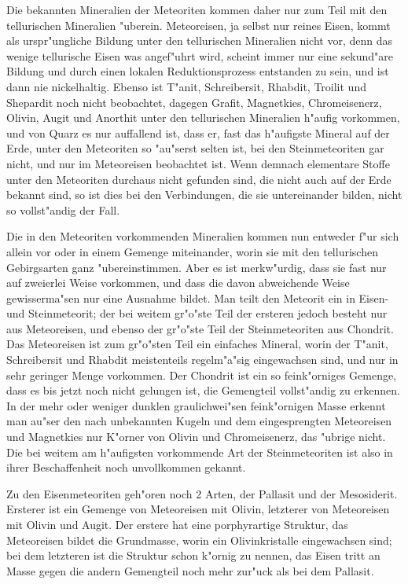 \documentclass[a4paper, 11pt, oneside]{article}
\begin{document}
Die bekannten Mineralien der Meteoriten kommen daher nur zum Teil mit den tellurischen Mineralien "uberein. Meteoreisen, ja selbst nur reines Eisen, kommt als urspr"ungliche Bildung unter den tellurischen Mineralien nicht vor, denn das wenige tellurische Eisen was angef"uhrt wird, scheint immer nur eine sekund"are Bildung und durch einen lokalen Reduktionsprozess entstanden zu sein, und ist dann nie nickelhaltig. Ebenso ist T"anit, Schreibersit, Rhabdit, Troilit und Shepardit noch nicht beobachtet, dagegen Grafit, Magnetkies, Chromeisenerz, Olivin, Augit und Anorthit unter den tellurischen Mineralien h"aufig vorkommen, und von Quarz es nur auffallend ist, dass er, fast das h"aufigste Mineral auf der Erde, unter den Meteoriten so "au"serst selten ist, bei den Steinmeteoriten gar nicht, und nur im Meteoreisen beobachtet ist. Wenn demnach elementare Stoffe unter den Meteoriten durchaus nicht gefunden sind, die nicht auch auf der Erde bekannt sind, so ist dies bei den Verbindungen, die sie untereinander bilden, nicht so vollst"andig der Fall.

Die in den Meteoriten vorkommenden Mineralien kommen nun entweder f"ur sich allein vor oder in einem Gemenge miteinander, worin sie mit den tellurischen Gebirgsarten ganz "ubereinstimmen. Aber es ist merkw"urdig, dass sie fast nur auf zweierlei Weise vorkommen, und dass die davon abweichende Weise gewisserma"sen nur eine Ausnahme bildet. Man teilt den Meteorit ein in Eisen- und Steinmeteorit; der bei weitem gr"o"ste Teil der ersteren jedoch besteht nur aus Meteoreisen, und ebenso der gr"o"ste Teil der Steinmeteoriten aus Chondrit. Das Meteoreisen ist zum gr"o"sten Teil ein einfaches Mineral, worin der T"anit, Schreibersit und Rhabdit meistenteils regelm"a"sig eingewachsen sind, und nur in sehr geringer Menge vorkommen. Der Chondrit ist ein so feink"orniges Gemenge, dass es bis jetzt noch nicht gelungen ist, die Gemengteil vollst"andig zu erkennen. In der mehr oder weniger dunklen graulichwei"sen feink"ornigen Masse erkennt man au"ser den nach unbekannten Kugeln und dem eingesprengten Meteoreisen und Magnetkies nur K"orner von Olivin und Chromeisenerz, das "ubrige nicht. Die bei weitem am h"aufigsten vorkommende Art der Steinmeteoriten ist also in ihrer Beschaffenheit noch unvollkommen gekannt.

Zu den Eisenmeteoriten geh"oren noch 2 Arten, der Pallasit und der Mesosiderit. Ersterer ist ein Gemenge von Meteoreisen mit Olivin, letzterer von Meteoreisen mit Olivin und Augit. Der erstere hat eine porphyrartige Struktur, das Meteoreisen bildet die Grundmasse, worin ein Olivinkristalle eingewachsen sind; bei dem letzteren ist die Struktur schon k"ornig zu nennen, das Eisen tritt an Masse gegen die andern Gemengteil noch mehr zur"uck als bei dem Pallasit.
\end{document}
